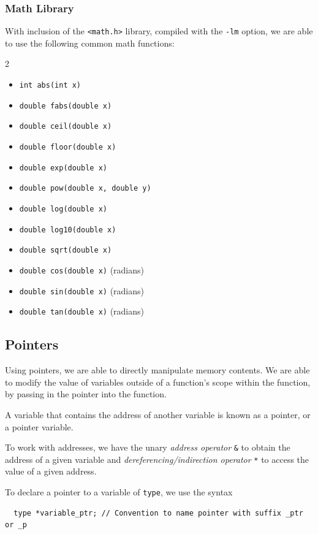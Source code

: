 \subsubsection{Math Library}
With inclusion of the \verb|<math.h>| library, compiled with the \verb|-lm|
option, we are able to use the following common math functions:
\begin{multicols}{2}
  \begin{itemize}
    \item \verb|int abs(int x)|
    \item \verb|double fabs(double x)|
    \item \verb|double ceil(double x)|
    \item \verb|double floor(double x)|
    \item \verb|double exp(double x)|
    \item \verb|double pow(double x, double y)|
  \end{itemize}
  \begin{itemize}
    \item \verb|double log(double x)|
    \item \verb|double log10(double x)|
    \item \verb|double sqrt(double x)|
    \item \verb|double cos(double x)| (radians)
    \item \verb|double sin(double x)| (radians)
    \item \verb|double tan(double x)| (radians)
  \end{itemize}
\end{multicols}

\subsection{Pointers}
Using pointers, we are able to directly manipulate memory contents. We are able
to modify the value of variables outside of a function's scope within the
function, by passing in the pointer into the function.
\begin{definition}[Pointer]
  A variable that contains the address of another variable is known as a
  pointer, or a pointer variable.
\end{definition}
To work with addresses, we have the unary \textit{address operator} \verb|&| to
obtain the address of a given variable and \textit{dereferencing/indirection
operator} \verb|*| to access the value of a given address.

To declare a pointer to a variable of \verb|type|, we use the syntax
\begin{lstlisting}
  type *variable_ptr; // Convention to name pointer with suffix _ptr or _p
\end{lstlisting}

